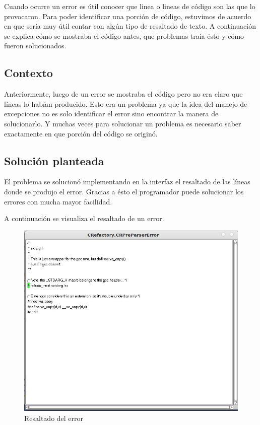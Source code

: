 \documentclass[a4paper,oneside,12pt]{article}
\begin{document}
Cuando ocurre un error es útil conocer que linea o lineas de código son las que lo provocaron. Para poder identificar una porción de código, estuvimos de acuerdo en que sería muy útil contar con algún tipo de resaltado de texto. A continuación se explica cómo se mostraba el código antes, que problemas traía ésto y cómo fueron solucionados.

\subsection{Contexto}
Anteriormente, luego de un error se mostraba el c\'odigo pero no era claro que l\'ineas lo hab\'ian producido. Esto era un problema ya que la idea del manejo de excepciones no es solo identificar el error sino encontrar la manera de solucionarlo. Y muchas veces para solucionar un problema es necesario saber exactamente en que porci\'on del c\'odigo se origin\'o.

\subsection{Soluci\'on planteada}
El problema se solucion\'o implementando en la interfaz el resaltado de las l\'ineas donde se produjo el error. Gracias a \'esto el programador puede solucionar los errores con mucha mayor facilidad.

A continuaci\'on se visualiza el resaltado de un error.
\begin{figure}[h!]
  \centering
    \includegraphics[scale=0.50]{images/codigo_modificado/highlight_preparser.jpg}
     \caption{Resaltado del error}
\end{figure}
\end{document}
